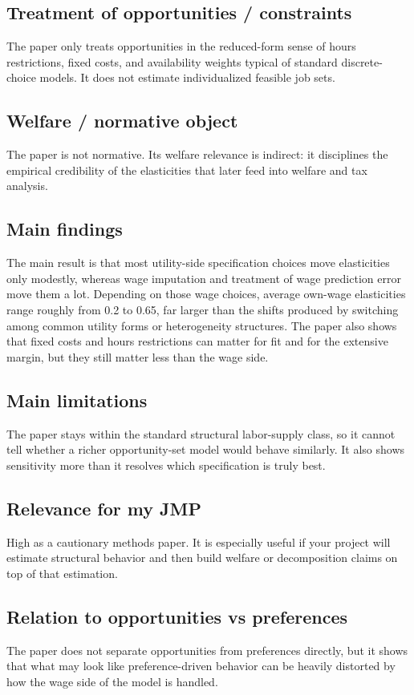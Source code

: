\documentclass[11pt,a4paper]{article}
\begin{document}
\subsection*{Treatment of opportunities / constraints}
The paper only treats opportunities in the reduced-form sense of hours restrictions, fixed costs, and availability weights typical of standard discrete-choice models. It does not estimate individualized feasible job sets.

\subsection*{Welfare / normative object}
The paper is not normative. Its welfare relevance is indirect: it disciplines the empirical credibility of the elasticities that later feed into welfare and tax analysis.

\subsection*{Main findings}
The main result is that most utility-side specification choices move elasticities only modestly, whereas wage imputation and treatment of wage prediction error move them a lot. Depending on those wage choices, average own-wage elasticities range roughly from 0.2 to 0.65, far larger than the shifts produced by switching among common utility forms or heterogeneity structures. The paper also shows that fixed costs and hours restrictions can matter for fit and for the extensive margin, but they still matter less than the wage side.

\subsection*{Main limitations}
The paper stays within the standard structural labor-supply class, so it cannot tell whether a richer opportunity-set model would behave similarly. It also shows sensitivity more than it resolves which specification is truly best.

\subsection*{Relevance for my JMP}
High as a cautionary methods paper. It is especially useful if your project will estimate structural behavior and then build welfare or decomposition claims on top of that estimation.

\subsection*{Relation to opportunities vs preferences}
The paper does not separate opportunities from preferences directly, but it shows that what may look like preference-driven behavior can be heavily distorted by how the wage side of the model is handled.
\end{document}
